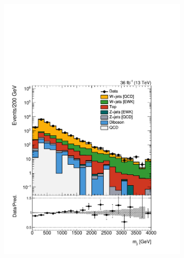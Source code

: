 \begin{figure}[]
\begin{center}
\begin{subfigure}[t]{0.24\textwidth}
            \includegraphics[width=\textwidth]{figures/vbf/prefit/singleelectron_jot12Mass_logy.pdf}
        \end{subfigure}
        \begin{subfigure}[t]{0.24\textwidth}

\end{subfigure}
\end{center}
\end{figure}
